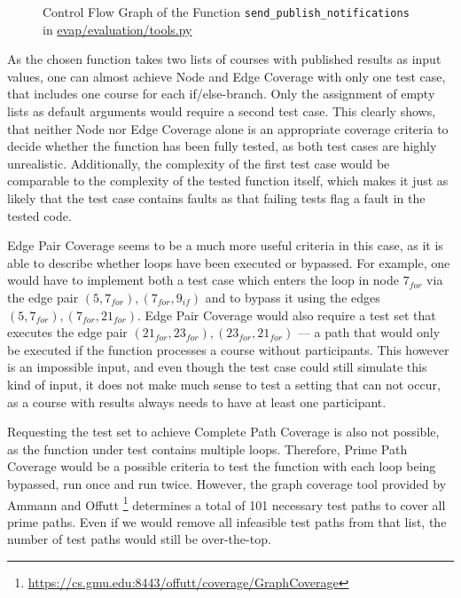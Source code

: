 
\begin{figure}
\caption{Control Flow Graph of the Function \texttt{send\_publish\_notifications} in \url{evap/evaluation/tools.py}}
\end{figure}

As the chosen function takes two lists of courses with published results as input values, one can almost achieve Node and Edge Coverage with only one test case, that includes one course for each if/else-branch.
Only the assignment of empty lists as default arguments would require a second test case.
This clearly shows, that neither Node nor Edge Coverage alone is an appropriate coverage criteria to decide whether the function has been fully tested, as both test cases are highly unrealistic.
Additionally, the complexity of the first test case would be comparable to the complexity of the tested function itself, which makes it just as likely that the test case contains faults as that failing tests flag a fault in the tested code.

Edge Pair Coverage seems to be a much more useful criteria in this case, as it is able to describe whether loops have been executed or bypassed.
For example, one would have to implement both a test case which enters the loop in node $7_{for}$ via the edge pair $(5,7_{for}), (7_{for},9_{if})$ and to bypass it using the edges $(5,7_{for}), (7_{for},21_{for})$.
Edge Pair Coverage would also require a test set that executes the edge pair $(21_{for}, 23_{for}), (23_{for}, 21_{for})$ --- a path that would only be executed if the function processes a course without participants.
This however is an impossible input, and even though the test case could still simulate this kind of input, it does not make much sense to test a setting that can not occur, as a course with results always needs to have at least one participant.

Requesting the test set to achieve Complete Path Coverage is also not possible, as the function under test contains multiple loops.
Therefore, Prime Path Coverage would be a possible criteria to test the function with each loop being bypassed, run once and run twice.
However, the graph coverage tool provided by Ammann and Offutt%
\footnote{\url{https://cs.gmu.edu:8443/offutt/coverage/GraphCoverage}}
determines a total of 101 necessary test paths to cover all prime paths.
Even if we would remove all infeasible test paths from that list, the number of test paths would still be over-the-top.

